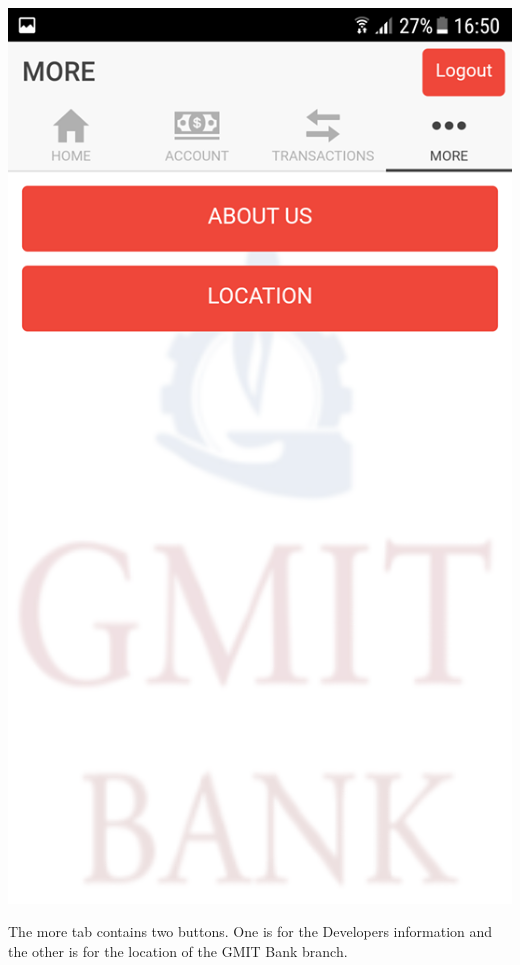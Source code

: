 \paragraph{}
\begin{center}
    \includegraphics[scale=0.5]{img/16morepage.png}
\end{center}
The more tab contains two buttons. One is for the Developers information and the other is for the location of the GMIT Bank branch.

